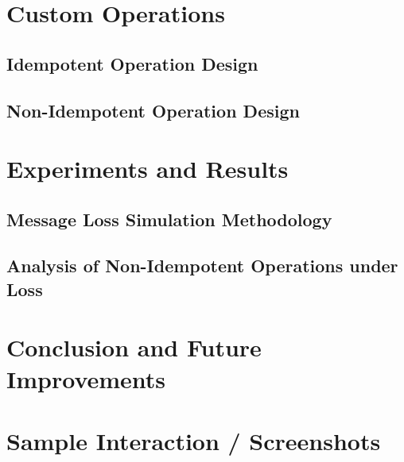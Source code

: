 \documentclass[11pt,a4paper]{article}
\begin{document}
\section{Custom Operations}
\subsection{Idempotent Operation Design}
\subsection{Non-Idempotent Operation Design}

\section{Experiments and Results}
\subsection{Message Loss Simulation Methodology}
\subsection{Analysis of Non-Idempotent Operations under Loss}

\section{Conclusion and Future Improvements}

\newpage
\appendix
\section{Sample Interaction / Screenshots}
\end{document}

